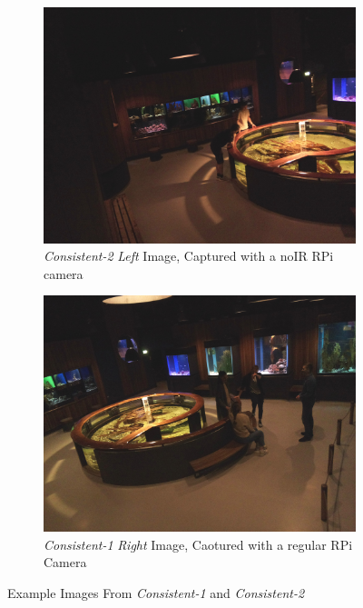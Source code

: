 \begin{figure}[H]
    \centering
    \begin{subfigure}{0.49\textwidth}
        \centering
        \includegraphics[width=\textwidth]{Images/DeviceImages/3rd/example.jpg}
        \caption{\centering \textit{Consistent-2 }\textit{Left} Image, Captured with a noIR RPi camera}
    \end{subfigure}
    \hfill
    \begin{subfigure}{0.49\textwidth}
        \centering
        \includegraphics[width=\textwidth]{Images/DeviceImages/2nd-iteration/example.jpg}
        \caption{\centering \textit{Consistent-1} \textit{Right} Image, Caotured with a regular RPi Camera}
    \end{subfigure}
    \caption{\centering Example Images From \textit{Consistent-1} and \textit{Consistent-2}}
    \label{fig:consistent_datasets_differences}
\end{figure}

